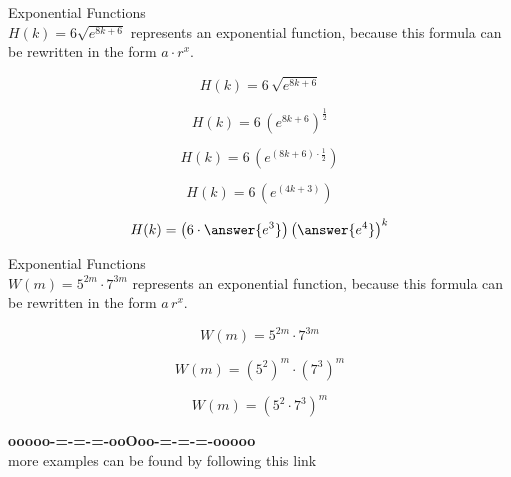 \documentclass{ximera}
\begin{document}
\begin{example}  Exponential Functions \\



$H(k) = 6 \sqrt{e^{8 k + 6}} $ represents an exponential function, because this formula can be rewritten in the form $a \cdot r^x$.   \\


\begin{explanation}


\[
H(k) = 6 \, \sqrt{e^{8 k + 6}}
\]


\[
H(k) = 6 \, \left( e^{8 k + 6} \right)^{\tfrac{1}{2}}
\]

\[
H(k) = 6 \, \left( e^{(8 k + 6 ) \cdot \tfrac{1}{2}} \right)
\]

\[
H(k) = 6 \, \left( e^{(4 k + 3)} \right)
\]

\[
H(k) = \left( 6 \cdot \answer{e^3} \right) \left( \answer{e^4} \right)^k
\]


\end{explanation}

\end{example}

















\begin{example}  Exponential Functions \\



$W(m) = 5^{2 m} \cdot 7^{3 m}$ represents an exponential function, because this formula can be rewritten in the form $a \, r^x$.   \\


\begin{explanation}


\[
W(m) = 5^{2 m} \cdot 7^{3 m}
\]


\[
W(m) = \left( 5^2 \right)^m \cdot \left( 7^3 \right)^m
\]

\[
W(m) = \left( 5^2 \cdot 7^3 \right)^m 
\]




\end{explanation}

\end{example}









\begin{center}
\textbf{\textcolor{green!50!black}{ooooo-=-=-=-ooOoo-=-=-=-ooooo}} \\

more examples can be found by following this link\\ 

\end{center}
\end{document}
